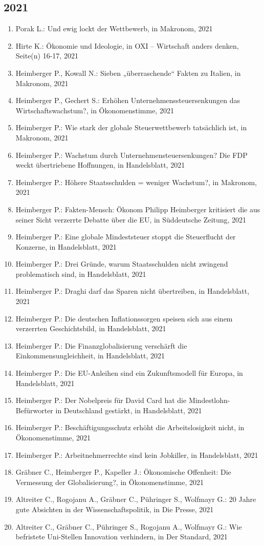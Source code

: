\subsection*{2021}
\begin{enumerate}
    	 \item Porak L.: Und ewig lockt der Wettbewerb, in Makronom, 2021
	 \item Hirte K.: Ökonomie und Ideologie, in OXI -- Wirtschaft anders denken, Seite(n) 16-17, 2021
	 \item Heimberger P., Kowall N.: Sieben „überraschende“ Fakten zu Italien, in Makronom, 2021
	 \item Heimberger P., Gechert S.: Erhöhen Unternehmenssteuersenkungen das Wirtschaftswachstum?, in Ökonomenstimme, 2021
	 \item Heimberger P.: Wie stark der globale Steuerwettbewerb tatsächlich ist, in Makronom, 2021
	 \item Heimberger P.: Wachstum durch Unternehmensteuersenkungen? Die FDP weckt übertriebene Hoffnungen, in Handelsblatt, 2021
	 \item Heimberger P.: Höhere Staatsschulden = weniger Wachstum?, in Makronom, 2021
	 \item Heimberger P.: Fakten-Mensch: Ökonom Philipp Heimberger kritisiert die aus seiner Sicht verzerrte Debatte über die EU, in Süddeutsche Zeitung, 2021
	 \item Heimberger P.: Eine globale Mindeststeuer stoppt die Steuerflucht der Konzerne, in Handelsblatt, 2021
	 \item Heimberger P.: Drei Gründe, warum Staatsschulden nicht zwingend problematisch sind, in Handelsblatt, 2021
	 \item Heimberger P.: Draghi darf das Sparen nicht übertreiben, in Handelsblatt, 2021
	 \item Heimberger P.: Die deutschen Inflationssorgen speisen sich aus einem verzerrten Geschichtsbild, in Handelsblatt, 2021
	 \item Heimberger P.: Die Finanzglobalisierung verschärft die Einkommensungleichheit, in Handelsblatt, 2021
	 \item Heimberger P.: Die EU-Anleihen sind ein Zukunftsmodell für Europa, in Handelsblatt, 2021
	 \item Heimberger P.: Der Nobelpreis für David Card hat die Mindestlohn-Befürworter in Deutschland gestärkt, in Handelsblatt, 2021
	 \item Heimberger P.: Beschäftigungsschutz erhöht die Arbeitslosigkeit nicht, in Ökonomenstimme, 2021
	 \item Heimberger P.: Arbeitnehmerrechte sind kein Jobkiller, in Handelsblatt, 2021
	 \item Gräbner C., Heimberger P., Kapeller J.: Ökonomische Offenheit: Die Vermessung der Globalisierung?, in Ökonomenstimme, 2021
	 \item Altreiter C., Rogojanu A., Gräbner C., Pühringer S., Wolfmayr G.: 20 Jahre gute Absichten in der Wissenschaftspolitik, in Die Presse, 2021
	 \item Altreiter C., Gräbner C., Pühringer S., Rogojanu A., Wolfmayr G.: Wie befristete Uni-Stellen Innovation verhindern, in Der Standard, 2021
\end{enumerate}
